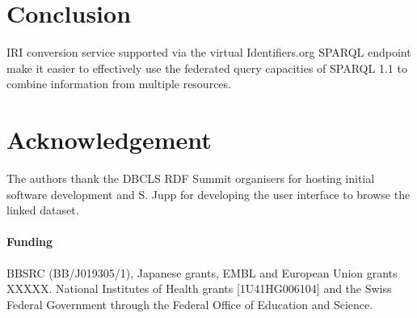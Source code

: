 \documentclass{bioinfo}
\begin{document}
\section{Conclusion}
IRI conversion service supported via the virtual Identifiers.org SPARQL endpoint make it easier to effectively use the federated query capacities of SPARQL 1.1 to combine information from multiple resources.

\section*{Acknowledgement}
The authors thank the DBCLS RDF Summit organisers for hosting initial software development and S. Jupp for developing the user interface to browse the linked dataset.

\paragraph{Funding\textcolon}
BBSRC (BB/J019305/1), Japanese grants, EMBL and European Union grants XXXXX. National Institutes of Health grants [1U41HG006104] and the Swiss Federal Government through the Federal Office of Education and Science.  


%
%
%
%
%
%
%
%
  
\end{document}
